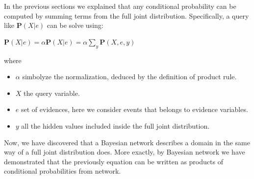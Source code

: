 In the previous sections we explained that any conditional probability can be computed by summing terms from the full joint distribution. Specifically, a query like $\mathbf{P}(X|e)$
can be solve using:
\begin{center}
    $\mathbf{P}(X|e) = \alpha \mathbf{P}(X|e) = \alpha \sum_{y}\mathbf{P}(X, e, y)$
\end{center}
where
\begin{itemize}
    \renewcommand{\labelitemi}{-}
    \item $\alpha$ simbolyze the normalization, deduced by the definition of product rule.
    \item $X$ the query variable.
    \item $e$ set of evidences, here we consider events that belongs to evidence variables.
    \item $y$ all the hidden values included inside the full joint distribution.
\end{itemize} \vspace{3.5pt}
Now, we have discovered that a Bayesian network describes a domain in the same way of a full joint distribution does. More exactly, by Bayesian network we have demonstrated
that the previously equation can be written as products of conditional probabilities from network. \vspace{7pt}

